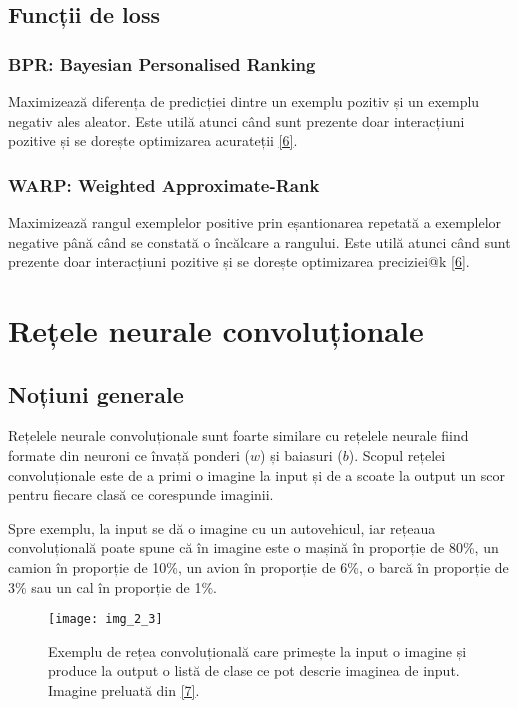 \subsection{Funcții de loss}

\subsubsection*{BPR: Bayesian Personalised Ranking}

Maximizează diferența de predicției dintre un exemplu pozitiv și un exemplu negativ ales aleator. Este utilă atunci când sunt prezente doar interacțiuni pozitive și se dorește optimizarea acurateții \hyperlink{lighfm}{[6]}.

\subsubsection*{WARP: Weighted Approximate-Rank}

Maximizează rangul exemplelor positive prin eșantionarea repetată a exemplelor negative până când se constată o încălcare a rangului. Este utilă atunci când sunt prezente doar interacțiuni pozitive și se dorește optimizarea preciziei@k \hyperlink{lighfm}{[6]}.

\section{Rețele neurale convoluționale}

\subsection{Noțiuni generale}

Rețelele neurale convoluționale sunt foarte similare cu rețelele neurale fiind formate din neuroni ce învață ponderi ($w$) și baiasuri ($b$). Scopul rețelei convoluționale este de a primi o imagine la input și de a scoate la output un scor pentru fiecare clasă ce corespunde imaginii. 

Spre exemplu, la input se dă o imagine cu un autovehicul, iar rețeaua convoluțională poate spune că în imagine este o mașină în proporție de 80\%, un camion în proporție de 10\%, un avion în proporție de 6\%, o barcă în proporție de 3\% sau un cal în proporție de 1\%.

\begin{figure}[!h]
	\centering
	\texttt{[image: img\_2\_3]}
	\caption[Exemplu rețea convoluțională]{Exemplu de rețea convoluțională care primește la input o imagine și produce la output o listă de clase ce pot descrie imaginea de input. Imagine preluată din \hyperlink{datameetsmedia}{[7]}.}
\end{figure} 

